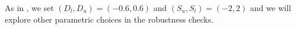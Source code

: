As in \cite{Xie2016}, we set $(D_l, D_u)=(-0.6,0.6)$ and $(S_u,S_l)=(-2,2)$ and we will explore other parametric choices in the robustness checks.






